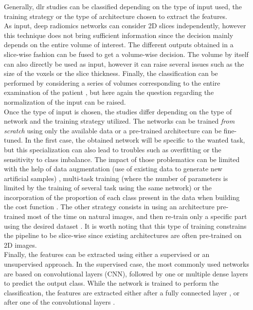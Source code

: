 Generally, \ac{dlr} studies can be classified depending on the type of
input used, the training strategy or the type of architecture chosen to
extract the features.\\
As input, deep radiomics networks can consider 2D slices independently,
however this technique does not bring sufficient information since the
decision mainly depends on the entire volume of interest.
The different outputs obtained in a slice-wise fashion can be fused to
get a volume-wise decision. The volume by itself can also directly be
used as input, however it can raise several issues such as the size of
the voxels or the slice thickness. Finally, the classification can be
performed by considering a series of volumes corresponding to the entire
examination of the patient \cite{Shen2016}, but here
again the question regarding the normalization of the input can be
raised. \\
Once the type of input is chosen, the studies differ depending on the
type of network and the training strategy utilized. 
The networks can be trained \emph{from scratch} using
only the available data or a pre-trained architecture can be fine-tuned.
In the first case, the obtained network will be specific to the wanted
task, but this specialization can also lead to troubles such as
overfitting or the sensitivity to class imbalance.
The impact of those problematics can be limited with the help of data
augmentation (use of existing data to generate new artificial samples) \cite{Kumar2017}, multi-task training (where the
number of parameters is limited by the training of several task using
the same network) or the
incorporation of the proportion of each class present in the data when
building the cost function \cite{Jamaludin2016}.
The other strategy consists in using an architecture pre-trained most of
the time on natural images, and then re-train only a specific part 
using the desired dataset \cite{Echaniz2017,Huynh2016,Paul2016}. It
is worth noting that this type of training constrains the pipeline to be
slice-wise since existing architectures are often pre-trained on 2D
images.\\
Finally, the features can be extracted using either a supervised or an
unsupervised approach. In the supervised case, the most commonly used
networks are based on convolutional layers (CNN), followed by one
or multiple dense layers to predict the output class. While the network
is trained to perform the classification, the features are extracted
either after a fully connected layer \cite{Paul2016}, or after one 
of the convolutional layers \cite{Li2017}.\\
